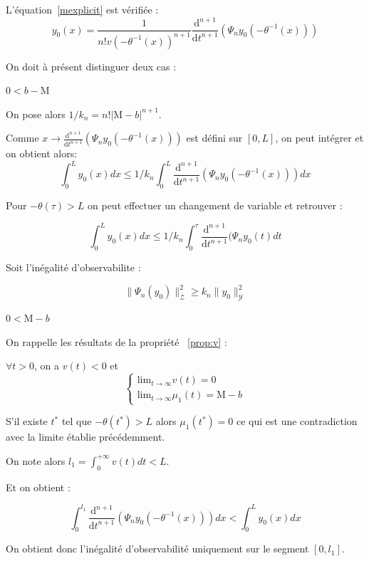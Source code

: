 \documentclass[a4paper]{article}
\newcommand{\mass}{\mathrm{M}}
\newcommand{\dep}{b}
\begin{document}
\begin{preuve}
	L'équation~\eqref{mexplicit} est vérifiée :
	\[y_0(x) = \frac{1}{n! v(-\theta^{-1}(x))^{n+1}} \frac{\mathrm{d}^{n+1}}{\mathrm{d}t^{n+1}} (\Psi_ny_0(-\theta^{-1}(x)))\]
	
	On doit à présent distinguer deux cas :
	
	\vspace{0.3cm}
	\underline{$0<\dep-\mass $}
	
	On pose alors $ 1/k_n = n! |\mass - \dep|^{n+1} $.
	
	Comme $x \to \frac{\mathrm{d}^{n+1}}{\mathrm{d}t^{n+1}} (\Psi_ny_0(-\theta^{-1}(x))) $ est défini sur $[0,L]$, on peut intégrer et on obtient 
	alors:
	\[ 
		\int_0^Ly_0(x)dx \leq 1/k_n \int_0^L \frac{\mathrm{d}^{n+1}}{\mathrm{d}t^{n+1}} (\Psi_ny_0(-\theta^{-1}(x))) dx
		\]

		
	Pour $ -\theta(\tau) > L$ on peut effectuer un changement de variable et retrouver :
	
	\[ \int_0^Ly_0(x)dx \leq 1/k_n \int_0^\tau \frac{\mathrm{d}^{n+1}}{\mathrm{d}t^{n+1}} (\Psi_ny_0(t) dt \]
	
	Soit l'inégalité d'observabilite :
	
	\[\| \Psi_n(y_0)\|_{\mathscr{Z}}^2 \geq k_n \|y_0\|^2_{\mathscr{Y}}\]
	
	
	\underline{$0<\mass-\dep$}
	
	On rappelle les résultats de la propriété ~\ref{prop:v} :
	
	$\forall t>0 $, on a $v(t)<0$ et 
	\[
	\begin{cases}
		\mathrm{lim}_{t \rightarrow \infty} v(t) = 0 \\
		\mathrm{lim}_{t \rightarrow \infty} \mu_1(t)= \mass -\dep 
	\end{cases}
	\]
	
	S'il existe $t^*$ tel que $- \theta(t^*)>L$ alors $\mu_1(t^*) =0$ 
	ce qui est une contradiction avec la limite établie précédemment.
	
	On note alors $l_1 = \int_0^{+\infty} v(t)dt < L $.
	
	Et on obtient :
	
	\[ 
\int_0^{l_1} \frac{\mathrm{d}^{n+1}}{\mathrm{d}t^{n+1}} (\Psi_ny_0(-\theta^{-1}(x))) dx
 < \int_0^L y_0(x)dx
		\]
	
	On obtient donc l'inégalité d'observabilité uniquement sur le segment $[0,l_1]$.
	
	
\end{preuve}

\end{document}
